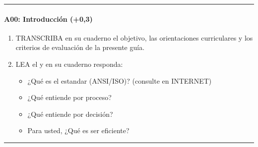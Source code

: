 \documentclass[letterpaper,10pt,spanish]{sphinxmanual}
\begin{document}
\bigskip\hrule\bigskip



\paragraph{A00: Introducción (+0,3)}
\label{\detokenize{cursos/ofimatica11/periodo01/G02:a00-introduccion-0-3}}
\sphinxAtStartPar
{}
\begin{enumerate}
%
\item {} 
\sphinxAtStartPar
TRANSCRIBA en su cuaderno el objetivo, las orientaciones curriculares y los criterios de evaluación de la presente guía.

\item {} 
\sphinxAtStartPar
LEA el  y en su cuaderno responda:
\begin{itemize}
\item {} 
\sphinxAtStartPar
¿Qué es el estandar (ANSI/ISO)? (consulte en INTERNET)

\item {} 
\sphinxAtStartPar
¿Qué entiende por proceso?

\item {} 
\sphinxAtStartPar
¿Qué entiende por decisión?

\item {} 
\sphinxAtStartPar
Para usted, ¿Qué es ser eficiente?

\end{itemize}

\end{enumerate}


\bigskip\hrule\bigskip
\end{document}
